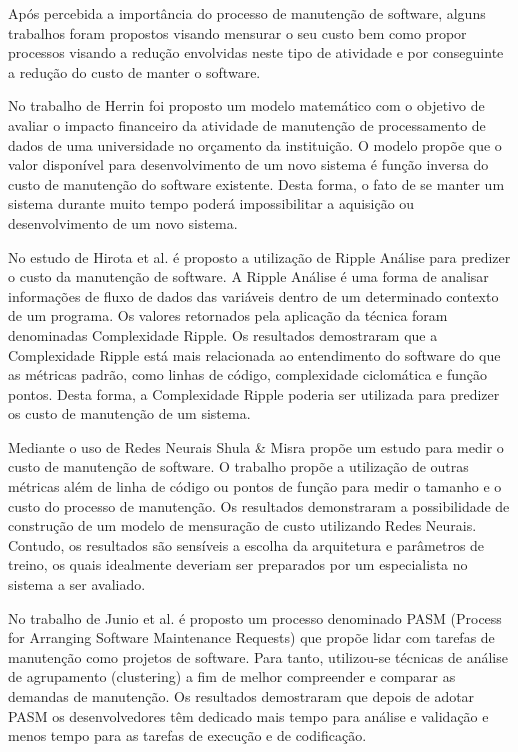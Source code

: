 \documentclass[msc,proposal,hidelot,hideabstract]{ppgccufmg} %
\begin{document}
Após percebida a importância do processo de manutenção de software,
alguns trabalhos foram propostos visando mensurar o seu custo bem como propor
processos visando a redução envolvidas neste tipo de atividade e por
conseguinte a redução do custo de manter o software.

No trabalho de Herrin \cite{Herrin:1985:SMC:323287.323383} foi proposto um modelo matemático com o
objetivo de avaliar o impacto financeiro da atividade de manutenção de
processamento de dados de uma universidade no orçamento da instituição. O
modelo propõe que o valor disponível para desenvolvimento de um novo sistema é
função inversa do custo de manutenção do software existente. Desta forma, o
fato de se manter um sistema durante muito tempo poderá impossibilitar a
aquisição ou desenvolvimento de um novo sistema.

No estudo de Hirota et al. \cite{hirota1994approach} é proposto a utilização de
Ripple Análise para predizer o custo da manutenção de software. A Ripple
Análise é uma forma de analisar informações de fluxo de dados das variáveis
dentro de um determinado contexto de um programa. Os valores retornados pela
aplicação da técnica foram denominadas Complexidade Ripple. Os resultados
demostraram que a Complexidade Ripple está mais relacionada ao entendimento do
software do que as métricas padrão, como linhas de código, complexidade
ciclomática e função pontos. Desta forma, a Complexidade Ripple poderia ser
utilizada para predizer os custo de manutenção de um sistema.

Mediante o uso de Redes Neurais Shula \& Misra
\cite{Shukla:2008:ESM:1342211.1342232} propõe um estudo para medir o custo de
manutenção de software. O trabalho propõe a utilização de outras métricas além
de linha de código ou pontos de função para medir o tamanho e o custo do
processo de manutenção. Os resultados demonstraram a possibilidade de
construção de um modelo de mensuração de custo utilizando Redes
Neurais. Contudo, os resultados são sensíveis a escolha da arquitetura e
parâmetros de treino, os quais idealmente deveriam ser preparados por um
especialista no sistema a ser avaliado.

No trabalho de Junio et al. \cite{5741246} é proposto um processo denominado PASM (Process for Arranging
Software Maintenance Requests) que propõe lidar com tarefas de manutenção como
projetos de software. Para tanto, utilizou-se técnicas de análise de
agrupamento (clustering) a fim de melhor compreender e comparar as demandas de
manutenção. Os resultados demostraram que depois de adotar PASM os
desenvolvedores têm dedicado mais tempo para análise e validação e menos tempo
para as tarefas de execução e de codificação.
\end{document}
